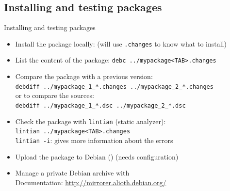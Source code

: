 \documentclass[10pt,final]{beamer}
\begin{document}
\subsection{Installing and testing packages}
\begin{frame}{Installing and testing packages}
  \begin{itemize}
  \item Install the package locally:  (will use \texttt{.changes}
    to know what to install) \br
  \item List the content of the package: \texttt{{\color{rouge}debc}
      ../mypackage<TAB>.changes} \br
  \item Compare the package with a previous version:\\
    \texttt{{\color{rouge}debdiff} ../mypackage\_1\_*.changes ../mypackage\_2\_*.changes}\\
    or to compare the sources:\\
    \texttt{{\color{rouge}debdiff} ../mypackage\_1\_*.dsc ../mypackage\_2\_*.dsc}\\
    \br
  \item Check the package with \texttt{lintian} (static analyzer):\\
    \texttt{{\color{rouge}lintian} ../mypackage<TAB>.changes}\\
    \texttt{lintian -i}: gives more information about the errors \br
  \item Upload the package to Debian () (needs configuration) \br
  \item Manage a private Debian archive with \\
    Documentation: \url{http://mirrorer.alioth.debian.org/}
  \end{itemize}
\end{frame}
\end{document}
